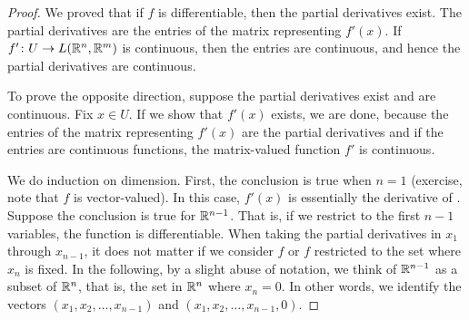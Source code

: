 \begin{proof}
We proved that if $f$ is differentiable, then
the partial derivatives exist.  The partial
derivatives are the entries of the matrix representing $f'(x)$.  If
$f' \colon U \to L({\mathbb{R}}^n,{\mathbb{R}}^m)$ is continuous, then the entries are
continuous, and hence the partial derivatives are continuous.

To prove the opposite direction,
suppose the partial derivatives exist and are continuous.
Fix $x \in U$.  If we show that $f'(x)$ exists, we are done, because
the entries of the matrix representing $f'(x)$ are the partial
derivatives and if the entries are continuous functions,
the matrix-valued function $f'$ is continuous.

We do induction on dimension.  First,
the conclusion is true when $n=1$
(exercise, note that $f$ is vector-valued).
In this case, $f'(x)$ is essentially the derivative of
.
Suppose the conclusion is true for ${\mathbb{R}}^{n-1}$.
That is,
if we restrict to the first $n-1$ variables, the function is differentiable.
When taking the partial derivatives in $x_1$ through $x_{n-1}$,
it does not matter if we consider $f$ or $f$ restricted to the set where
$x_n$ is fixed.
In the following, by a slight abuse of notation,
we think of ${\mathbb{R}}^{n-1}$ as a subset of ${\mathbb{R}}^n$, that is, the set in ${\mathbb{R}}^n$ where $x_n = 0$.
In other words, we identify the vectors $(x_1,x_2,\ldots,x_{n-1})$ and
$(x_1,x_2,\ldots,x_{n-1},0)$.


\end{proof}
